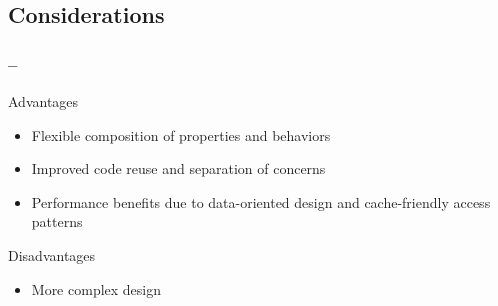 \subsection{Considerations}

\begin{frame}
    \frametitle{\insertsection{} -- \insertsubsection{}}

    \begin{fancycolumns}[widths={40,60}]
        \begin{motivation}{Advantages}
            \begin{itemize}
                \item Flexible composition of properties and behaviors
                \item Improved code reuse and separation of concerns
                \item Performance benefits due to data-oriented design and cache-friendly access patterns
            \end{itemize}
        \end{motivation}
        \begin{note}{Disadvantages}
            \begin{itemize}
                \item More complex design
            \end{itemize}
        \end{note}
        \nextcolumn
    \end{fancycolumns}



\end{frame}
